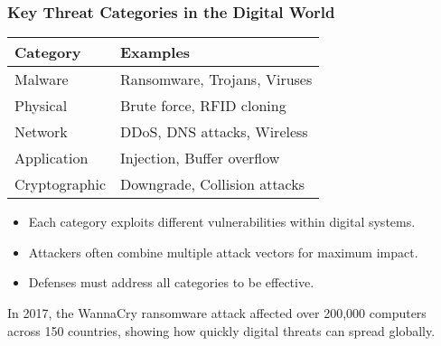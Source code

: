 \documentclass{beamer}
\begin{document}
\begin{frame}
    \frametitle{Key Threat Categories in the Digital World}
    
    \begin{table}
        \centering
        \begin{tabular}{l|l}
            \textbf{Category} & \textbf{Examples} \\
            \hline
            Malware & Ransomware, Trojans, Viruses \\
            Physical & Brute force, RFID cloning \\
            Network & DDoS, DNS attacks, Wireless \\
            Application & Injection, Buffer overflow \\
            Cryptographic & Downgrade, Collision attacks \\
        \end{tabular}
    \end{table}
    
    \begin{itemize}
        \item Each category exploits different vulnerabilities within digital systems.
        \item Attackers often combine multiple attack vectors for maximum impact.
        \item Defenses must address all categories to be effective.
    \end{itemize}
    
    \begin{example}
        In 2017, the WannaCry ransomware attack affected over 200,000 computers across 150 countries, showing how quickly digital threats can spread globally.
    \end{example}
\end{frame}
\end{document}
